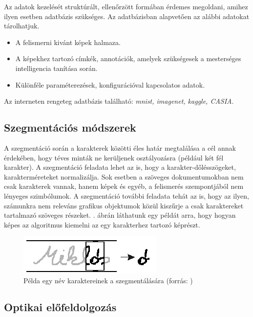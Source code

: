 Az adatok kezelését struktúrált, ellenőrzött formában érdemes megoldani, amihez ilyen esetben adatbázis szükséges. Az adatbázisban alapvetően az alábbi adatokat tárolhatjuk.

\begin{itemize}
\item A felismerni kivánt képek halmaza. 
\item A képekhez tartozó címkék, annotációk, amelyek szükségesek a mesterséges intelligencia tanítása során.
\item Különféle paraméterezések, konfigurációval kapcsolatos adatok.
\end{itemize}

Az interneten rengeteg adatbázis található: \textit{mnist, imagenet, kaggle, CASIA}.

\subsection{Szegmentációs módszerek}

A szegmentáció során a karakterek közötti éles határ megtalálása a cél annak érdekében, hogy téves minták ne kerüljenek osztályozásra (például két fél karakter). A szegmentáció feladata lehet az is, hogy a karakter-dőlésszögeket, karakterméreteket normalizálja. Sok esetben a szöveges dokumentumokban nem csak karakterek vannak, hanem képek és egyéb, a felismerés szempontjából nem lényeges szimbólumok. A szegmentáció további feladata tehát az is, hogy az ilyen, számunkra nem releváns grafikus objektumok közül kiszűrje a csak karaktereket tartalmazó szöveges részeket. . ábrán láthatunk egy példát arra, hogy hogyan képes az algoritmus kiemelni az egy karakterhez tartozó képrészt.

\begin{figure}[h]
\centering
\includegraphics[scale=1.0]{images/ocr_segmentation}
\caption{Példa egy név karaktereinek a szegmentálására (forrás: \cite{tmwebdvi77})}
\label{fig:ocr_segmentation}
\end{figure}

\subsection{Optikai előfeldolgozás}

